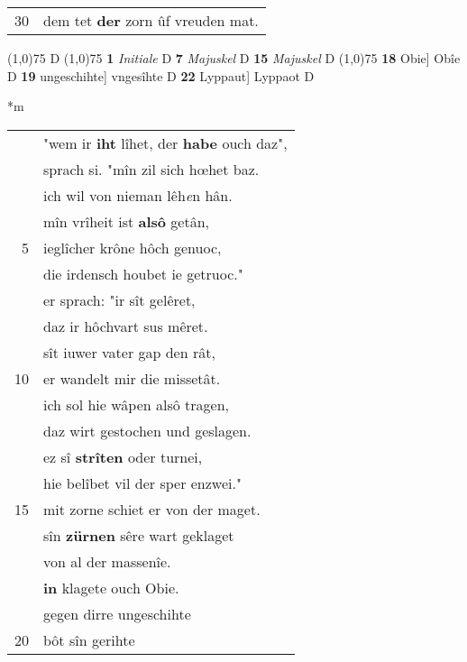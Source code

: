 \documentclass[8pt,a4paper,notitlepage]{article}
\begin{document}
\begin{table}[ht]
\begin{minipage}[t]{0.5\linewidth}
\begin{tabular}{rl}
30 & dem tet \textbf{der} zorn ûf vreuden mat.\\ 
\end{tabular}
\scriptsize
\line(1,0){75} \newline
D \newline
\line(1,0){75} \newline
\textbf{1} \textit{Initiale} D  \textbf{7} \textit{Majuskel} D  \textbf{15} \textit{Majuskel} D  \newline
\line(1,0){75} \newline
\textbf{18} Obie] Obîe D \textbf{19} ungeschihte] vngesîhte D \textbf{22} Lyppaut] Lyppaot D \newline
\end{minipage}
\hspace{0.5cm}
\begin{minipage}[t]{0.5\linewidth}
\small
\begin{center}*m
\end{center}
\begin{tabular}{rl}
 & "wem ir \textbf{iht} lîhet, der \textbf{habe} ouch daz",\\ 
 & sprach si. "mîn zil sich hœhet baz.\\ 
 & ich wil von nieman lêh\textit{e}n hân.\\ 
 & mîn vrîheit ist \textbf{alsô} getân,\\ 
5 & ieglîcher krône hôch genuoc,\\ 
 & die irdensch houbet ie getruoc."\\ 
 & er sprach: "ir sît gelêret,\\ 
 & daz ir hôchvart sus mêret.\\ 
 & sît iuwer vater gap den rât,\\ 
10 & er wandelt mir die missetât.\\ 
 & ich sol hie wâpen alsô tragen,\\ 
 & daz wirt gestochen und geslagen.\\ 
 & ez sî \textbf{strîten} oder turnei,\\ 
 & hie belîbet vil der sper enzwei."\\ 
15 & mit zorne schiet er von der maget.\\ 
 & sîn \textbf{zürnen} sêre wart geklaget\\ 
 & von al der massenîe.\\ 
 & \textbf{in} klagete ouch Obie.\\ 
 & gegen dirre ungeschihte\\ 
20 & bôt sîn gerihte\\ 

\end{tabular}
\end{minipage}
\end{table}
\end{document}
